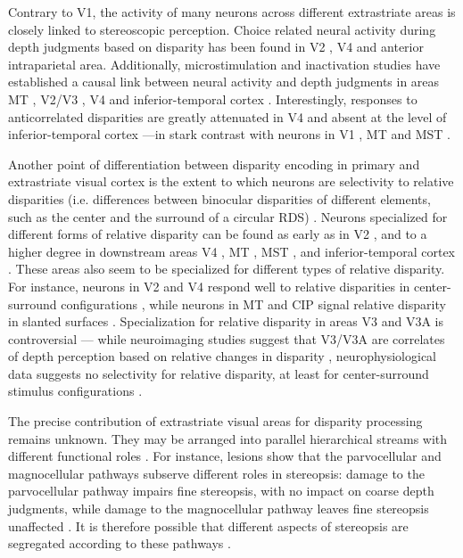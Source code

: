 Contrary to V1, the activity of many neurons across different extrastriate areas is closely linked to stereoscopic perception. Choice related neural activity during depth judgments based on disparity has been found in V2 \cite{Clery:2015lh,Nienborg:2007ly,Nienborg:2006qo}, V4 \cite{Shiozaki:2012ys} and anterior intraparietal area\cite{Verhoef:2015cz}. Additionally, microstimulation and inactivation studies have established a causal link between neural activity and depth judgments in areas MT \cite{DeAngelis:1998df}, V2/V3 \cite{Smolyanskaya:2015ve}, V4 \cite{Shiozaki:2012ys} and inferior-temporal cortex \cite{Verhoef:2012dg}. Interestingly, responses to anticorrelated disparities are greatly attenuated in V4 \cite{Tanabe:2004mw} and absent at the level of inferior-temporal cortex \cite{Janssen:2003fk}---in stark contrast with neurons in V1 \cite{Cumming:1997ve}, MT \cite{Krug:2004fk} and MST \cite{Takemura:2001bd}.

Another point of differentiation between disparity encoding in primary and extrastriate visual cortex is the extent to which neurons are selectivity to relative disparities (i.e. differences between binocular disparities of different elements, such as the center and the surround of a circular RDS) \cite{Cumming:2000vn}. Neurons specialized for different forms of relative disparity can be found as early as in V2 \cite{Thomas:2002ud}, and to a higher degree in downstream areas V4 \cite{Umeda:2007vn}, MT \cite{Nguyenkim:2003if}, MST \cite{Roy:1992kc,Roy:1990hs}, and inferior-temporal cortex \cite{Janssen:1999nx,Janssen:2000oq}. These areas also seem to be specialized for different types of relative disparity. For instance, neurons in V2 and V4 respond well to relative disparities in center-surround configurations \cite{Thomas:2002ud,Umeda:2007vn}, while neurons in MT and CIP signal relative disparity in slanted surfaces \cite{Nguyenkim:2003if,Rosenberg:2013fk}. Specialization for relative disparity in areas V3 and V3A is controversial --- while neuroimaging studies suggest that V3/V3A are correlates of depth perception based on relative changes in disparity \cite{Backus:2001ly,Tsao:2003lk,Ban:2015cr}, neurophysiological data suggests no selectivity for relative disparity, at least for center-surround stimulus configurations \cite{Anzai:2011gb}.

The precise contribution of extrastriate visual areas for disparity processing remains unknown. They may be arranged into parallel hierarchical streams with different functional roles \cite{Tyler:1990gb}. For instance, lesions show that the parvocellular and magnocellular pathways subserve different roles in stereopsis: damage to the parvocellular pathway impairs fine stereopsis, with no impact on coarse depth judgments, while damage to the magnocellular pathway leaves fine stereopsis unaffected \cite{Schiller:1990sh}. It is therefore possible that different aspects of stereopsis are segregated according to these pathways \cite{Tyler:1990gb}.

